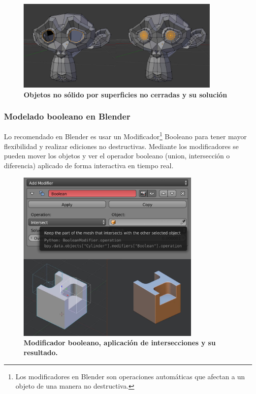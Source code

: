 \begin{figure}[h]
\includegraphics[width=10cm]{Img/Modelos/modelado21.jpg}
\centering
\caption{\textbf{ \footnotesize{Objetos no sólido por superficies no cerradas y su solución }}}
\label{fig:blender}
\end{figure}

\vspace{5mm}
\subsubsection{Modelado booleano en Blender}

Lo recomendado en Blender es usar un Modificador\footnote{
Los modificadores en Blender son operaciones automáticas que afectan a un objeto de una manera no destructiva.} Booleano para tener mayor flexibilidad y realizar ediciones no destructivas. Mediante los modificadores se pueden mover los objetos y ver el operador booleano (union, intersección o diferencia) aplicado de forma interactiva en tiempo real.

\begin{figure}[h]
\includegraphics[width=9cm]{Img/Modelos/modelado22.jpg}
\centering
\caption{\textbf{ \footnotesize{Modificador booleano, aplicación de intersecciones y su resultado. }}}
\end{figure}

